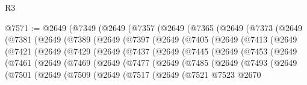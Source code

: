 \begin{lexlean}{R3}
\begin{coremodule}
@7571 := @2649
    (@7349
      (@2649
        (@7357
          (@2649
            (@7365
              (@2649
                (@7373
                  (@2649
                    (@7381
                      (@2649
                        (@7389
                          (@2649
                            (@7397
                              (@2649
                                (@7405
                                  (@2649
                                    (@7413
                                      (@2649
                                        (@7421
                                          (@2649
                                            (@7429
                                              (@2649
                                                (@7437
                                                  (@2649
                                                    (@7445
                                                      (@2649
                                                        (@7453
                                                          (@2649
                                                            (@7461
                                                              (@2649
                                                                (@7469
                                                                  (@2649
                                                                    (@7477
                                                                      (@2649
                                                                        (@7485
                                                                          (@2649
                                                                            (@7493
                                                                              (@2649
                                                                                (@7501
                                                                                  (@2649
                                                                                    (@7509
                                                                                      (@2649
                                                                                        (@7517
                                                                                          (@2649
                                                                                            (@7521
                                                                                              @7523
                                                                                              @2670

\end{coremodule}
\end{lexlean}
